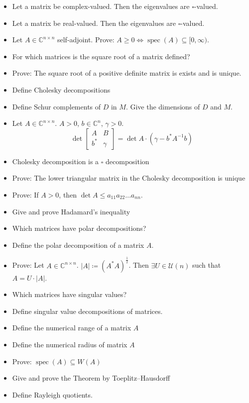 \documentclass[a4paper]{article}
\newcommand{\card}[1]{\left|#1\right|}
\begin{document}
\begin{itemize}
  \item Let a matrix be complex-valued. Then the eigenvalues are $\square{}$-valued.
  \item Let a matrix be real-valued. Then the eigenvalues are $\square{}$-valued.
  \item Let $A \in \mathbb C^{n \times n}$ self-adjoint. Prove: $A \geq 0 \iff \operatorname{spec}(A) \subseteq [0, \infty)$.
  \item For which matrices is the square root of a matrix defined?
  \item Prove: The square root of a positive definite matrix is exists and is unique.
  \item Define Cholesky decompositions
  \item Define Schur complements of $D$ in $M$. Give the dimensions of $D$ and $M$.
  \item Let $A \in \mathbb C^{n \times n}$. $A > 0$, $b \in \mathbb C^n$, $\gamma > 0$.
    \[ \det\left[\begin{array}{c|c}A & B \\ \hline b^* & \gamma \end{array}\right] = \det A \cdot (\gamma - b^* A^{-1} b)  \]
  \item Cholesky decomposition is a $\square{}$ decomposition
  \item Prove: The lower triangular matrix in the Cholesky decomposition is unique
  \item Prove: If $A > 0$, then $\det{A} \leq a_{11} a_{22} \dots a_{nn}$.
  \item Give and prove Hadamard's inequality
  \item Which matrices have polar decompositions?
  \item Define the polar decomposition of a matrix $A$.
  \item Prove: Let $A \in \mathbb C^{n \times n}$. $\card{A} \coloneqq (A^* A)^{\frac12}$. Then $\exists U \in \mathcal U(n)$ such that $A = U \cdot \card{A}$.
  \item Which matrices have singular values?
  \item Define singular value decompositions of matrices.
  \item Define the numerical range of a matrix $A$
  \item Define the numerical radius of matrix $A$
  \item Prove: $\operatorname{spec}(A) \subseteq W(A)$
  \item Give and prove the Theorem by Toeplitz--Hausdorff
  \item Define Rayleigh quotients.

\end{itemize}
\end{document}
